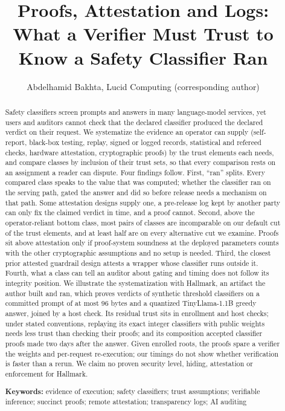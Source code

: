 \documentclass[11pt]{article}
\title{Proofs, Attestation and Logs: What a Verifier Must Trust to Know a Safety Classifier Ran}
\author{Abdelhamid Bakhta, Lucid Computing (corresponding author)}
\date{}
\begin{document}
\maketitle

\begin{abstract}
Safety classifiers screen prompts and answers in many language-model services, yet users and auditors cannot check that the declared classifier produced the declared verdict on their request. We systematize the evidence an operator can supply (self-report, black-box testing, replay, signed or logged records, statistical and refereed checks, hardware attestation, cryptographic proofs) by the trust elements each needs, and compare classes by inclusion of their trust sets, so that every comparison rests on an assignment a reader can dispute. Four findings follow. First, ``ran'' splits. Every compared class speaks to the value that was computed; whether the classifier ran on the serving path, gated the answer and did so before release needs a mechanism on that path. Some attestation designs supply one, a pre-release log kept by another party can only fix the claimed verdict in time, and a proof cannot. Second, above the operator-reliant bottom class, most pairs of classes are incomparable on our default cut of the trust elements, and at least half are on every alternative cut we examine. Proofs sit above attestation only if proof-system soundness at the deployed parameters counts with the other cryptographic assumptions and no setup is needed. Third, the closest prior attested guardrail design attests a wrapper whose classifier runs outside it. Fourth, what a class can tell an auditor about gating and timing does not follow its integrity position. We illustrate the systematization with Hallmark, an artifact the author built and ran, which proves verdicts of synthetic threshold classifiers on a committed prompt of at most 96 bytes and a quantized TinyLlama-1.1B greedy answer, joined by a host check. Its residual trust sits in enrollment and host checks; under stated conventions, replaying its exact integer classifiers with public weights needs less trust than checking their proofs; and its composition accepted classifier proofs made two days after the answer. Given enrolled roots, the proofs spare a verifier the weights and per-request re-execution; our timings do not show whether verification is faster than a rerun. We claim no proven security level, hiding, attestation or enforcement for Hallmark.

\medskip\noindent \textbf{Keywords:} evidence of execution; safety classifiers; trust assumptions; verifiable inference; succinct proofs; remote attestation; transparency logs; AI auditing
\end{abstract}
\end{document}
